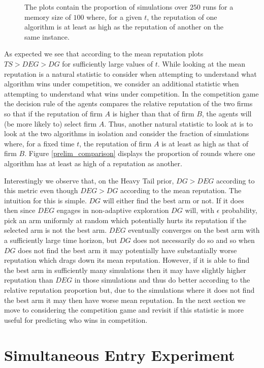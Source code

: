 \documentclass{article}
\theoremstyle{definition}
\begin{document}
\begin{figure}
\caption*{\tiny{The plots contain the proportion of simulations over $250$ runs for a memory size of $100$ where, for a given $t$, the reputation of one algorithm is at least as high as the reputation of another on the same instance.}}
\label{relative_rep}
\end{figure}

As expected we see that according to the mean reputation plots $TS > DEG > DG$ for sufficiently large values of $t$. While looking at the mean reputation is a natural statistic to consider when attempting to understand what algorithm wins under competition, we consider an additional statistic when attempting to understand what wins under competition. In the competition game the decision rule of the agents compares the relative reputation of the two firms so that if the reputation of firm $A$ is higher than that of firm $B$, the agents will (be more likely to) select firm $A$. Thus, another natural statistic to look at is to look at the two algorithms in isolation and consider the fraction of simulations where, for a fixed time $t$, the reputation of firm $A$ is at least as high as that of firm $B$. Figure \ref{prelim_comparison} displays the proportion of rounds where one algorithm has at least as high of a reputation as another.

Interestingly we observe that, on the Heavy Tail prior, $DG > DEG$ according to this metric even though $DEG > DG$ according to the mean reputation. The intuition for this is simple. $DG$ will either find the best arm or not. If it does then since $DEG$ engages in non-adaptive exploration $DG$ will, with $\epsilon$ probability, pick an arm uniformly at random which potentially hurts its reputation if the selected arm is not the best arm. $DEG$ eventually converges on the best arm with a sufficiently large time horizon, but $DG$ does not necessarily do so and so when $DG$ does not find the best arm it may potentially have substantially worse reputation which drags down its mean reputation. However, if it is able to find the best arm in sufficiently many simulations then it may have slightly higher reputation than $DEG$ in those simulations and thus do better according to the relative reputation proportion but, due to the simulations where it does not find the best arm it may then have worse mean reputation. In the next section we move to considering the competition game and revisit if this statistic is more useful for predicting who wins in competition.

\section{Simultaneous Entry Experiment}
\label{S:6}
\end{document}
